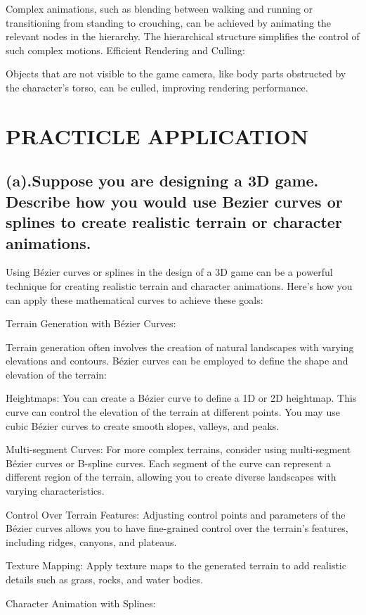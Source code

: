 \documentclass{article}
\begin{document}
\begin{itemize}
Complex animations, such as blending between walking and running or transitioning from standing to crouching, can be achieved by animating the relevant nodes in the hierarchy. The hierarchical structure simplifies the control of such complex motions.
Efficient Rendering and Culling:

Objects that are not visible to the game camera, like body parts obstructed by the character's torso, can be culled, improving rendering performance.
\section{PRACTICLE APPLICATION}
\subsection{(a).Suppose you are designing a 3D game. Describe how you would use Bezier curves or splines to create realistic terrain or character animations.}
Using Bézier curves or splines in the design of a 3D game can be a powerful technique for creating realistic terrain and character animations. Here's how you can apply these mathematical curves to achieve these goals:

Terrain Generation with Bézier Curves:

Terrain generation often involves the creation of natural landscapes with varying elevations and contours. Bézier curves can be employed to define the shape and elevation of the terrain:

Heightmaps: You can create a Bézier curve to define a 1D or 2D heightmap. This curve can control the elevation of the terrain at different points. You may use cubic Bézier curves to create smooth slopes, valleys, and peaks.

Multi-segment Curves: For more complex terrains, consider using multi-segment Bézier curves or B-spline curves. Each segment of the curve can represent a different region of the terrain, allowing you to create diverse landscapes with varying characteristics.

Control Over Terrain Features: Adjusting control points and parameters of the Bézier curves allows you to have fine-grained control over the terrain's features, including ridges, canyons, and plateaus.

Texture Mapping: Apply texture maps to the generated terrain to add realistic details such as grass, rocks, and water bodies.

Character Animation with Splines:


\end{itemize}
\end{document}
